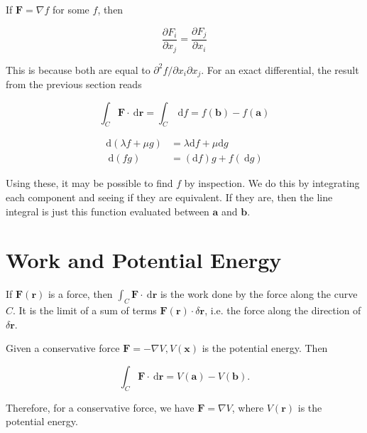 \begin{nprop}
	If $\mathbf{F}=\nabla f$ for some $f$, then
	
	$$
	\frac{\partial F_i}{\partial x_j}=\frac{\partial F_j}{\partial x_i}
	$$
	
	
	This is because both are equal to $\partial^2 f / \partial x_i \partial x_j$. For an exact differential, the result from the previous section reads
	
	$$
	\int_C \mathbf{F} \cdot \mathrm{~d} \mathbf{r}=\int_C \mathrm{~d} f=f(\mathbf{b})-f(\mathbf{a})
	$$
\end{nprop}

\begin{nprop}
	
	$$
	\begin{aligned}
		\mathrm{d}(\lambda f+\mu g) & =\lambda \mathrm{d} f+\mu \mathrm{d} g \\
		\mathrm{~d}(f g) & =(\mathrm{d} f) g+f(\mathrm{~d} g)
	\end{aligned}
	$$
	
	Using these, it may be possible to find $f$ by inspection. We do this by integrating each component and seeing if they are equivalent. If they are, then the line integral is just this function evaluated between $\mathbf{a}$ and $\mathbf{b}$.
\end{nprop}

\section{Work and Potential Energy}

\begin{ndefi}
	If $\mathbf{F}(\mathbf{r})$ is a force, then $\int_C \mathbf{F} \cdot \mathrm{~d} \mathbf{r}$ is the work done by the force along the curve $C$. It is the limit of a sum of terms $\mathbf{F}(\mathbf{r}) \cdot \delta \mathbf{r}$, i.e. the force along the direction of $\delta \mathbf{r}$.
	
\end{ndefi}

\begin{ndefi}
	Given a conservative force $\mathbf{F}=-\nabla V, V(\mathbf{x})$ is the potential energy. Then
	
	$$
	\int_C \mathbf{F} \cdot \mathrm{~d} \mathbf{r}=V(\mathbf{a})-V(\mathbf{b}) .
	$$
	
	
	Therefore, for a conservative force, we have $\mathbf{F}=\nabla V$, where $V(\mathbf{r})$ is the potential energy.
\end{ndefi}

